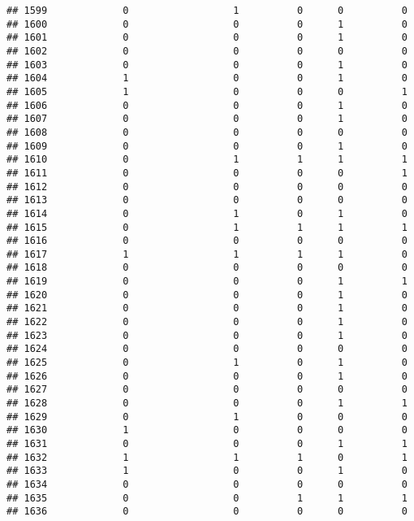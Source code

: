 \documentclass[
]{article}
\begin{document}
\begin{verbatim}
## 1599             0                  1          0      0          0
## 1600             0                  0          0      1          0
## 1601             0                  0          0      1          0
## 1602             0                  0          0      0          0
## 1603             0                  0          0      1          0
## 1604             1                  0          0      1          0
## 1605             1                  0          0      0          1
## 1606             0                  0          0      1          0
## 1607             0                  0          0      1          0
## 1608             0                  0          0      0          0
## 1609             0                  0          0      1          0
## 1610             0                  1          1      1          1
## 1611             0                  0          0      0          1
## 1612             0                  0          0      0          0
## 1613             0                  0          0      0          0
## 1614             0                  1          0      1          0
## 1615             0                  1          1      1          1
## 1616             0                  0          0      0          0
## 1617             1                  1          1      1          0
## 1618             0                  0          0      0          0
## 1619             0                  0          0      1          1
## 1620             0                  0          0      1          0
## 1621             0                  0          0      1          0
## 1622             0                  0          0      1          0
## 1623             0                  0          0      1          0
## 1624             0                  0          0      0          0
## 1625             0                  1          0      1          0
## 1626             0                  0          0      1          0
## 1627             0                  0          0      0          0
## 1628             0                  0          0      1          1
## 1629             0                  1          0      0          0
## 1630             1                  0          0      0          0
## 1631             0                  0          0      1          1
## 1632             1                  1          1      0          1
## 1633             1                  0          0      1          0
## 1634             0                  0          0      0          0
## 1635             0                  0          1      1          1
## 1636             0                  0          0      0          0

\end{verbatim}
\end{document}
